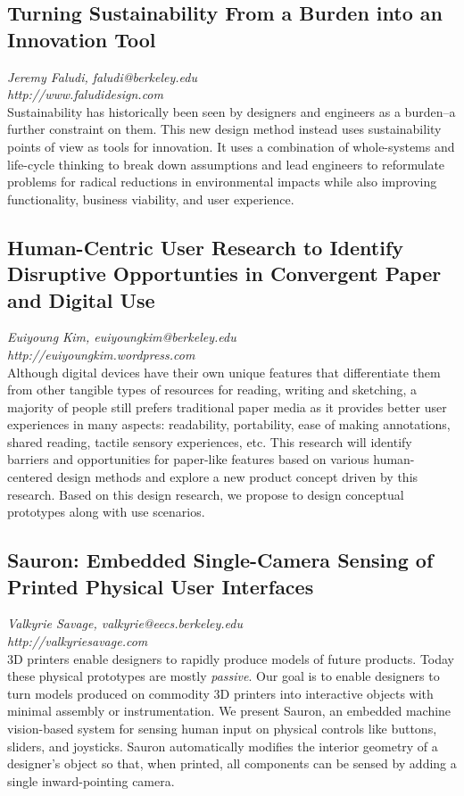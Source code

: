 \documentclass[foldmark,10pt,a4paper,notumble]{leaflet}
\begin{document}
\subsection{Turning Sustainability From a Burden into an Innovation Tool}
\emph{Jeremy Faludi, faludi@berkeley.edu}\\
\emph{http://www.faludidesign.com}\\
Sustainability has historically been seen by designers and engineers as a burden--a further constraint on them.  This new design method instead uses sustainability points of view as tools for innovation.  It uses a combination of whole-systems and life-cycle thinking to break down assumptions and lead engineers to reformulate problems for radical reductions in environmental impacts while also improving functionality, business viability, and user experience.
\subsection{Human-Centric User Research to Identify Disruptive Opportunties in Convergent Paper and Digital Use}
\emph{Euiyoung Kim, euiyoungkim@berkeley.edu}\\
\emph{http://euiyoungkim.wordpress.com}\\
Although digital devices have their own unique features that differentiate them from other
tangible types of resources for reading, writing and sketching, a majority of people still prefers traditional
paper media as it provides better user experiences in many aspects: readability, portability, ease of
making annotations, shared reading, tactile sensory experiences, etc. This research will identify
barriers and opportunities for paper-like features based on various human-centered design methods and
explore a new product concept driven by this research. Based on this design research, we propose to
design conceptual prototypes along with use scenarios. 
\subsection{Sauron: Embedded Single-Camera Sensing of Printed Physical User Interfaces}
\emph{Valkyrie Savage, valkyrie@eecs.berkeley.edu}\\
\emph{http://valkyriesavage.com}\\
3D printers enable designers to rapidly produce models of future products.  Today these physical prototypes are mostly \emph{passive}.  Our goal is to enable designers to turn models produced on commodity 3D printers into interactive objects with minimal assembly or instrumentation.  We present Sauron, an embedded machine vision-based system for sensing human input on physical controls like buttons, sliders, and joysticks.  Sauron automatically modifies the interior geometry of a designer's object so that, when printed, all components can be sensed by adding a single inward-pointing camera.
\end{document}
